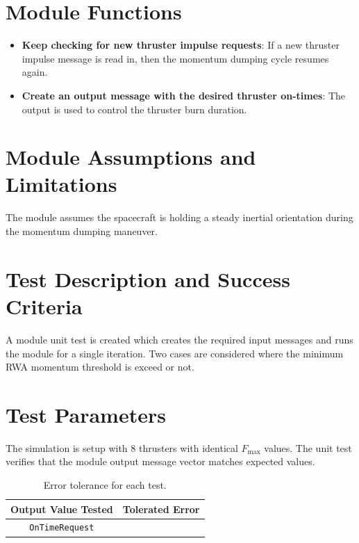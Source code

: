 \documentclass[]{BasiliskReportMemo}
\begin{document}
\section{Module Functions}
\begin{itemize}
	\item \textbf{Keep checking for new thruster impulse requests}: If a new thruster impulse message is read in, then the momentum dumping cycle resumes again.
	\item \textbf{Create an output message with the desired thruster on-times}: The output is used to control the thruster burn duration.
\end{itemize}

\section{Module Assumptions and Limitations}
The module assumes the spacecraft is holding a steady inertial orientation during the momentum dumping maneuver.  










\section{Test Description and Success Criteria}
A module unit test is created which creates the required input messages and runs the module for a single iteration.  Two cases are considered where the minimum RWA momentum threshold is exceed or not.




\section{Test Parameters}
The simulation is setup with 8 thrusters  with identical $F_{\text{max}}$ values.  
The unit test verifies that the module output  message vector matches expected values.
\begin{table}[htbp]
	\caption{Error tolerance for each test.}
	\label{tab:errortol}
	\centering \fontsize{10}{10}\selectfont
	\begin{tabular}{ c | c } %
		\hline\hline
		\textbf{Output Value Tested}  & \textbf{Tolerated Error}  \\ 
		\hline
		{\tt OnTimeRequest}        & 	   \\ 
		\hline\hline
	\end{tabular}
\end{table}
\end{document}
